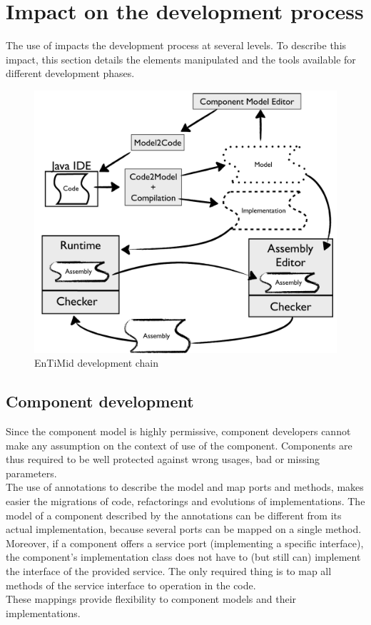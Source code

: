 \section{Impact on the development process}

The use of \enti{} impacts the development process at several levels. To describe this impact, this section details the elements manipulated and the tools available for different development phases.

\begin{figure}[h!]
  \centering
  \includegraphics[width=.8\textwidth]{part2/pics/Chain.pdf}
  \caption{EnTiMid development chain}
  \label{fig:devchain}
\end{figure}


\subsection{Component development}

Since the component model is highly permissive, component developers cannot make any assumption on the context of use of the component. Components are thus required to be well protected against wrong usages, bad or missing parameters.\\
The use of annotations to describe the model and map ports and methods, makes easier the migrations of code, refactorings and evolutions of implementations.
The model of a component described by the annotations can be different from its actual implementation, because several ports can be mapped on a single method.
Moreover, if a component offers a service port (implementing a specific interface), the component's implementation class does not have to (but still can) implement the interface of the provided service. The only required thing is to map all methods of the service interface to operation in the code.\\
These mappings provide flexibility to component models and their implementations.\\

